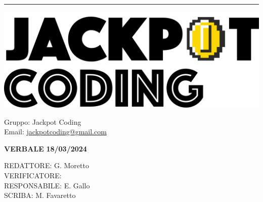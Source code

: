 \documentclass[5pt]{article}
\begin{document}
\hrule
\begin{minipage}[t]{0.50\textwidth}
    \begin{flushleft}
        \hspace{10pt}
        \includegraphics[scale=0.65]{jackpot-logo.png} 
    \end{flushleft}
\end{minipage}
\hspace{-60pt} %
\begin{flushright}
    \begin{minipage}[t]{0.50\textwidth}
        \begin{flushright}
            Gruppo: {\Large Jackpot Coding}\\
            Email: \href{mailto:jackpotcoding@gmail.com}{jackpotcoding@gmail.com}
        \end{flushright}
    \end{minipage}
\end{flushright}

\vspace{15pt}

\begin{center}
    \textbf{\large VERBALE }
    \textbf{\large 18/03/2024} \\
    \textbf{\Large}
\end{center}

\vspace{13pt}

\begin{flushleft}
    \begin{spacing}{1.5}
        REDATTORE:  G. Moretto\\
        VERIFICATORE:  \\%
        RESPONSABILE: E. Gallo\\%
        \vspace{7pt}
        SCRIBA: M. Favaretto\\%
    \end{spacing}
\end{flushleft}
\end{document}
